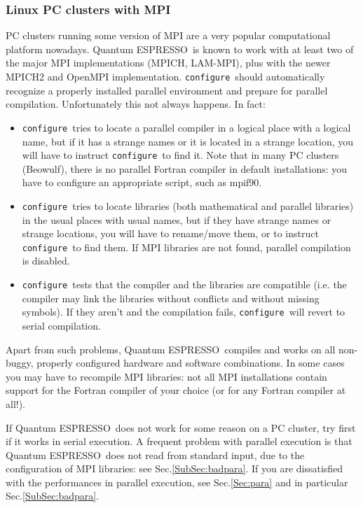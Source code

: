 \documentclass[12pt,a4paper]{article}
\def\qe{{\sc Quantum ESPRESSO}}
\def\configure{\texttt{configure}}
\begin{document}
\subsubsection{Linux PC clusters with MPI}
\label{SubSec:LinuxPCMPI}
PC clusters running some version of MPI are a very popular
computational platform nowadays. \qe\ is known to work
with at least two of the major MPI implementations (MPICH, LAM-MPI),
plus with the newer MPICH2 and OpenMPI implementation.
\configure\ should automatically recognize a properly installed
parallel environment and prepare for parallel compilation.
Unfortunately this not always happens. In fact:
\begin{itemize}
\item \configure\ tries to locate a parallel compiler in a logical
  place with a logical name,  but if it has a strange names or it is
  located  in a strange location, you will have to instruct \configure\
  to find it. Note that in many PC clusters (Beowulf), there is no
  parallel Fortran compiler in default installations:  you have to
  configure an appropriate script, such as mpif90.
\item \configure\ tries to locate libraries (both mathematical and
  parallel libraries) in the usual places with usual names, but if
  they have strange names or strange locations, you will have to
  rename/move them, or to instruct \configure\ to find them. If MPI
  libraries are not found,
  parallel compilation is disabled.
\item \configure\ tests that the compiler and the libraries are
  compatible (i.e. the compiler may link the libraries without
  conflicts and without missing symbols). If they aren't and the
  compilation fails, \configure\ will revert to serial compilation.
\end{itemize}

Apart from such problems, \qe\ compiles and works on all non-buggy, properly
configured hardware and software combinations. In some cases you may have to
recompile MPI libraries: not all MPI installations contain support for
the Fortran compiler of your choice (or for any Fortran compiler
at all!).

If \qe\ does not work for some reason on a PC cluster,
try first if it works in serial execution. A frequent problem with parallel
execution is that \qe\ does not read from standard input,
due to the configuration of MPI libraries: see Sec.\ref{SubSec:badpara}.
If you are dissatisfied with the performances in parallel execution,
see Sec.\ref{Sec:para} and in particular Sec.\ref{SubSec:badpara}.
\end{document}
